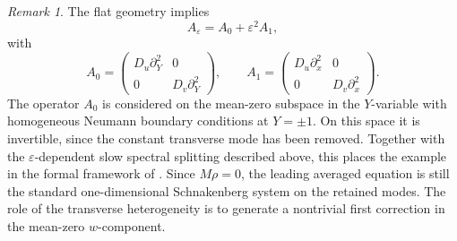 \documentclass[11pt]{article}
\theoremstyle{definition}
\theoremstyle{remark}
\newtheorem{remark}[theorem]{Remark}
\numberwithin{equation}{section}
\begin{document}
\begin{remark}
The flat geometry implies
\[
A_\varepsilon=A_0+\varepsilon^2A_1,
\]
with
\[
A_0=
\begin{pmatrix}
D_u\partial_Y^2 & 0\\
0 & D_v\partial_Y^2
\end{pmatrix},
\qquad
A_1=
\begin{pmatrix}
D_u\partial_x^2 & 0\\
0 & D_v\partial_x^2
\end{pmatrix}.
\]
The operator \(A_0\) is considered on the mean-zero subspace in the
\(Y\)-variable with homogeneous Neumann boundary conditions at \(Y=\pm1\).
On this space it is invertible, since the constant transverse mode has been
removed. Together with the \(\varepsilon\)-dependent slow spectral splitting
described above, this places the example in the formal framework of
. Since \(M\rho=0\), the leading averaged equation
is still the standard one-dimensional Schnakenberg system on the retained
modes. The role of the transverse heterogeneity is to generate a nontrivial
first correction in the mean-zero \(w\)-component.
\end{remark}
\end{document}
